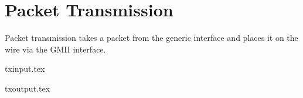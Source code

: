 \section{Packet Transmission}
Packet transmission takes a packet from the generic interface and
places it on the wire via the GMII interface.

{txinput.tex}

{txoutput.tex}


